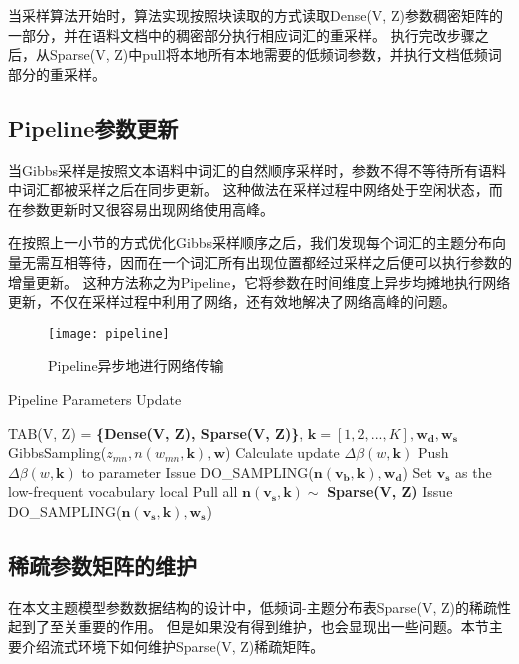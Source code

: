 当采样算法开始时，算法实现按照块读取的方式读取Dense(V, Z)参数稠密矩阵的一部分，并在语料文档中的稠密部分执行相应词汇的重采样。
执行完改步骤之后，从Sparse(V, Z)中pull将本地所有本地需要的低频词参数，并执行文档低频词部分的重采样。

\subsection{Pipeline参数更新}
当Gibbs采样是按照文本语料中词汇的自然顺序采样时，参数不得不等待所有语料中词汇都被采样之后在同步更新。
这种做法在采样过程中网络处于空闲状态，而在参数更新时又很容易出现网络使用高峰。

在按照上一小节的方式优化Gibbs采样顺序之后，我们发现每个词汇的主题分布向量无需互相等待，因而在一个词汇所有出现位置都经过采样之后便可以执行参数的增量更新。
这种方法称之为Pipeline，它将参数在时间维度上异步均摊地执行网络更新，不仅在采样过程中利用了网络，还有效地解决了网络高峰的问题。

\begin{figure}[htb]\centering
\texttt{[image: pipeline]}
\caption{Pipeline异步地进行网络传输}
\label{fig:pipeline}       %
\end{figure}


\begin{algorithm}[htb]
\caption{Pipeline Parameters Update} 
\label{alg:vocab-order}
\begin{algorithmic}[1]
\Require TAB(V, Z) = \textbf{\{Dense(V, Z), Sparse(V, Z)\}}, $\mathbf{k} = [1, 2, ..., K], \mathbf{w_d, w_s}$
\State GibbsSampling($z_{mn}, n(w_{mn}, \mathbf{k}), \mathbf{w}$)
\EndFor
\State Calculate update $\Delta \beta(w, \mathbf{k})$
\State Push $\Delta \beta(w, \mathbf{k})$ to parameter
\EndFor
\EndFunction
{}
\State Issue DO\_SAMPLING($\mathbf{n(v_b, k), w_d}$)
\EndFor
\State Set $\mathbf{v_s}$ as the low-frequent vocabulary local
\State Pull all $\mathbf{n(v_s, k)} \sim $ \textbf{Sparse(V, Z)}
\State Issue DO\_SAMPLING($\mathbf{n(v_s, k), w_s}$)
\end{algorithmic}  
\end{algorithm}  

\subsection{稀疏参数矩阵的维护}
在本文主题模型参数数据结构的设计中，低频词-主题分布表Sparse(V, Z)的稀疏性起到了至关重要的作用。
但是如果没有得到维护，也会显现出一些问题。本节主要介绍流式环境下如何维护Sparse(V, Z)稀疏矩阵。

